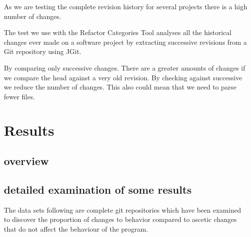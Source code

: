 As we are testing the complete revision history for several projects there is a high number of changes. 

The test we use with the Refactor Categories Tool analyses all the historical changes ever made on a software project by extracting successive revisions from a Git repository using JGit.

By comparing only successive changes.
  There are a greater amounts of changes if we compare the head against a very old revision. By checking against successive we reduce the number of changes. This also could mean that we need to parse fewer files.


\section{Results}
\subsection{overview}
\subsection{detailed examination of some results}

The data sets following are complete git repositories which have been examined to discover the proportion of changes to behavior compared to ascetic changes that do not affect the behaviour of the program. 

% 
% 

